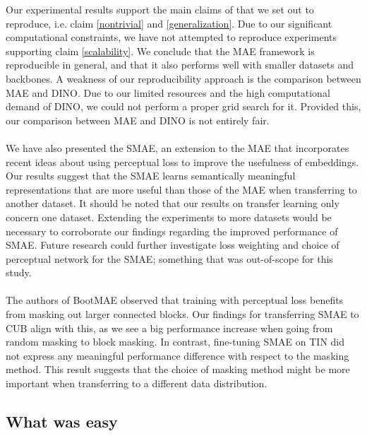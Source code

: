 
Our experimental results support the main claims of \cite{mae} that we set out to reproduce, i.e. claim \ref{nontrivial} and \ref{generalization}. Due to our significant computational constraints, we have not attempted to reproduce experiments supporting claim \ref{scalability}. We conclude that the MAE framework is reproducible in general, and that it also performs well with smaller datasets and backbones. A weakness of our reproducibility approach is the comparison between MAE and DINO. Due to our limited resources and the high computational demand of DINO, we could not perform a proper grid search for it. Provided this, our comparison between MAE and DINO is not entirely fair.
\\\\
We have also presented the SMAE, an extension to the MAE that incorporates recent ideas about using perceptual loss to improve the usefulness of embeddings. Our results suggest that the SMAE learns semantically meaningful representations that are more useful than those of the MAE when transferring to another dataset. It should be noted that our results on transfer learning only concern one dataset. Extending the experiments to more datasets would be necessary to corroborate our findings regarding the improved performance of SMAE. Future research could further investigate loss weighting and choice of perceptual network for the SMAE; something that was out-of-scope for this study.
\\\\
The authors of BootMAE \cite{bootmae} observed that training with perceptual loss benefits from masking out larger connected blocks. Our findings for transferring SMAE to CUB align with this, as we see a big performance increase when going from random masking to block masking. In contrast, fine-tuning SMAE on TIN did not express any meaningful performance difference with respect to the masking method. This result suggests that the choice of masking method might be more important when transferring to a different data distribution.

\subsection{What was easy}

